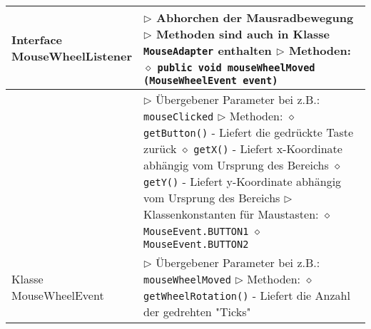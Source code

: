 \begin{longtable}{ | p{} p{} | }
	\makecell[l]{Interface \\ MouseWheelListener} & \makecell[l]{
	$\triangleright$ Abhorchen der Mausradbewegung \\
	$\triangleright$ Methoden sind auch in Klasse \texttt{MouseAdapter} enthalten \\
	$\triangleright$ Methoden: \\
	\hspace{0.4cm} $\diamond$ \texttt{public void mouseWheelMoved (MouseWheelEvent event)}} \\ \hline

	\makecell[l]{Klasse MouseEvent} & \makecell[l]{
	$\triangleright$ Übergebener Parameter bei z.B.: \texttt{mouseClicked} \\
	$\triangleright$ Methoden: \\
	\hspace{0.4cm} $\diamond$ \texttt{getButton()} \\
	\hspace{0.6cm} - Liefert die gedrückte Taste zurück \\
	\hspace{0.4cm} $\diamond$ \texttt{getX()} \\
	\hspace{0.6cm} - Liefert x-Koordinate abhängig vom Ursprung des Bereichs \\
	\hspace{0.4cm} $\diamond$ \texttt{getY()} \\
	\hspace{0.6cm} - Liefert y-Koordinate abhängig vom Ursprung des Bereichs \\
	$\triangleright$ Klassenkonstanten für Maustasten: \\
	\hspace{0.4cm} $\diamond$ \texttt{MouseEvent.BUTTON1} \\
	\hspace{0.4cm} $\diamond$ \texttt{MouseEvent.BUTTON2}} \\ \hline

	\makecell[l]{Klasse \\ MouseWheelEvent} & \makecell[l]{
	$\triangleright$ Übergebener Parameter bei z.B.: \texttt{mouseWheelMoved} \\
	$\triangleright$ Methoden: \\
	\hspace{0.4cm} $\diamond$ \texttt{getWheelRotation()} \\
	\hspace{0.6cm} - Liefert die Anzahl der gedrehten "Ticks"  } \\ \hline


\end{longtable}
